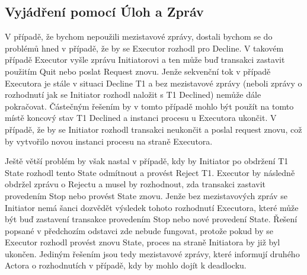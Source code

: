 \documentclass[]{article}
\begin{document}
\subsection{Vyjádření pomocí Úloh a Zpráv}


V případě, že bychom nepoužili mezistavové zprávy, dostali bychom se do problémů hned v případě, že by se Executor rozhodl pro Decline. V takovém případě Executor vyšle zprávu Initiatorovi a ten může buď transakci zastavit použitím Quit nebo poslat Request znovu. Jenže sekvenční tok v případě Executora je stále v situaci Decline T1 a bez mezistavové zprávy (neboli zprávy o rozhodnutí jak se Initiator rozhodl naložit s T1 Declined) nemůže dále pokračovat. Částečným řešením by v tomto případě mohlo být použít na tomto místě koncový stav T1 Declined a instanci procesu u Executora ukončit. V případě, že by se Initiator rozhodl transakci neukončit a poslal request znovu, což by vytvořilo novou instanci procesu na straně Executora.

Ještě větší problém by však nastal v případě, kdy by Initiator po obdržení T1 State rozhodl tento State odmítnout a provést Reject T1. Executor by následně obdržel zprávu o Rejectu a musel by rozhodnout, zda transakci zastavit provedením Stop nebo provést State znovu. Jenže bez mezistavových zpráv se Initiator nemá šanci dozvědět výsledek tohoto rozhodnutí Executora, které může být buď zastavení transakce provedením Stop nebo nové provedení State. Řešení popsané v předchozím odstavci zde nebude fungovat, protože pokud by se Executor rozhodl provést znovu State, proces na straně Initiatora by již byl ukončen. Jediným řešením jsou tedy mezistavové zprávy, které informují druhého Actora o rozhodnutích v případě, kdy by mohlo dojít k deadlocku.
\end{document}
